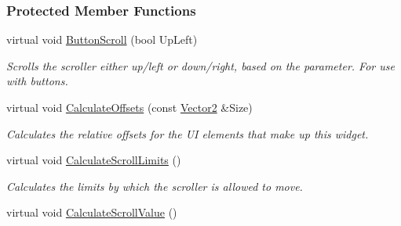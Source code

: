 \subsubsection*{Protected Member Functions}
\begin{DoxyCompactItemize}
\item 
\hypertarget{classphys_1_1UI_1_1Scrollbar_a31a2e11f27f087154fd61d7cc2cd6dc1}{
virtual void \hyperlink{classphys_1_1UI_1_1Scrollbar_a31a2e11f27f087154fd61d7cc2cd6dc1}{ButtonScroll} (bool UpLeft)}
\label{classphys_1_1UI_1_1Scrollbar_a31a2e11f27f087154fd61d7cc2cd6dc1}

\begin{DoxyCompactList}\small\item\em Scrolls the scroller either up/left or down/right, based on the parameter. For use with buttons. \item\end{DoxyCompactList}\item 
\hypertarget{classphys_1_1UI_1_1Scrollbar_a4621d6713a059196f1a358a23b9ad5ae}{
virtual void \hyperlink{classphys_1_1UI_1_1Scrollbar_a4621d6713a059196f1a358a23b9ad5ae}{CalculateOffsets} (const \hyperlink{classphys_1_1Vector2}{Vector2} \&Size)}
\label{classphys_1_1UI_1_1Scrollbar_a4621d6713a059196f1a358a23b9ad5ae}

\begin{DoxyCompactList}\small\item\em Calculates the relative offsets for the UI elements that make up this widget. \item\end{DoxyCompactList}\item 
\hypertarget{classphys_1_1UI_1_1Scrollbar_aa59e2c0662ac13fac037164c86f829f5}{
virtual void \hyperlink{classphys_1_1UI_1_1Scrollbar_aa59e2c0662ac13fac037164c86f829f5}{CalculateScrollLimits} ()}
\label{classphys_1_1UI_1_1Scrollbar_aa59e2c0662ac13fac037164c86f829f5}

\begin{DoxyCompactList}\small\item\em Calculates the limits by which the scroller is allowed to move. \item\end{DoxyCompactList}\item 
\hypertarget{classphys_1_1UI_1_1Scrollbar_afc9eb290c8dcf3935e2b3046063989e9}{
virtual void \hyperlink{classphys_1_1UI_1_1Scrollbar_afc9eb290c8dcf3935e2b3046063989e9}{CalculateScrollValue} ()}
\label{classphys_1_1UI_1_1Scrollbar_afc9eb290c8dcf3935e2b3046063989e9}


\end{DoxyCompactItemize}
